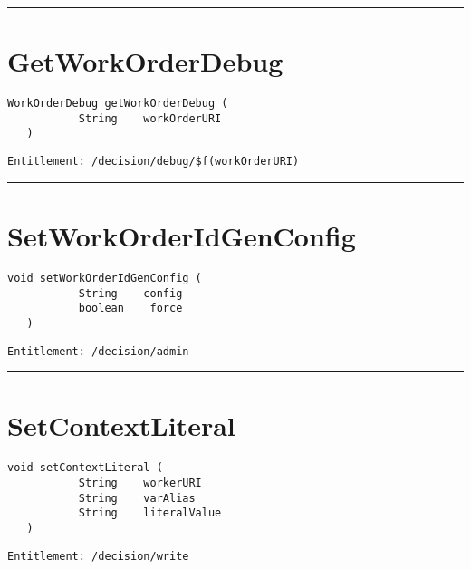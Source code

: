 \rule{12cm}{2pt}
\section{GetWorkOrderDebug}
\label{Api:GetWorkOrderDebug}
\begin{lstlisting}[style=nonumbers]
   WorkOrderDebug getWorkOrderDebug (
           String    workOrderURI
   )
\end{lstlisting}
\begin{Verbatim}[formatcom=\color{Maroon}]
  Entitlement: /decision/debug/$f(workOrderURI)
\end{Verbatim}



\rule{12cm}{2pt}
\section{SetWorkOrderIdGenConfig}
\label{Api:SetWorkOrderIdGenConfig}
\begin{lstlisting}[style=nonumbers]
   void setWorkOrderIdGenConfig (
           String    config
           boolean    force
   )
\end{lstlisting}
\begin{Verbatim}[formatcom=\color{Maroon}]
  Entitlement: /decision/admin
\end{Verbatim}



\rule{12cm}{2pt}
\section{SetContextLiteral}
\label{Api:SetContextLiteral}
\begin{lstlisting}[style=nonumbers]
   void setContextLiteral (
           String    workerURI
           String    varAlias
           String    literalValue
   )
\end{lstlisting}
\begin{Verbatim}[formatcom=\color{Maroon}]
  Entitlement: /decision/write
\end{Verbatim}




